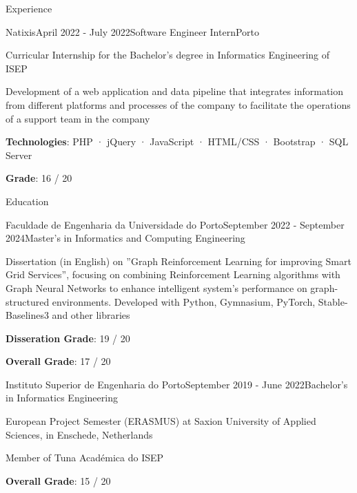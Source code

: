 \documentclass[
	11pt, %
]{cv} %
\begin{document}
\begin{rSection}{Experience}
	\begin{rSubsection}{Natixis}{April 2022 - July 2022}{Software Engineer Intern}{Porto}
		\item Curricular Internship for the Bachelor’s degree in Informatics Engineering of ISEP
		\item Development of a web application and data pipeline that integrates information from different platforms and processes of the company to facilitate the operations of a support team in the company
		\item \textbf{Technologies}: PHP · jQuery · JavaScript · HTML/CSS · Bootstrap · SQL Server
		\item \textbf{Grade}: 16 / 20
	\end{rSubsection}
\end{rSection}


\begin{rSection}{Education}
	
	\begin{rSubsection}{Faculdade de Engenharia da Universidade do Porto}{September 2022 - September 2024}{Master's in Informatics and Computing Engineering}{}
		\item Dissertation (in English) on ”Graph Reinforcement Learning for improving Smart Grid Services”, focusing on combining Reinforcement Learning algorithms with Graph Neural Networks to enhance intelligent system’s performance on graph-structured environments. Developed with Python, Gymnasium, PyTorch, Stable-Baselines3 and other libraries
		\item \textbf{Disseration Grade}: 19 / 20
		\item \textbf{Overall Grade}: 17 / 20
	\end{rSubsection}
	
	\begin{rSubsection}{Instituto Superior de Engenharia do Porto}{September 2019 - June 2022}{Bachelor's in Informatics Engineering}{}
		\item European Project Semester (ERASMUS) at Saxion University of Applied Sciences, in Enschede, Netherlands
		\item Member of Tuna Académica do ISEP 
		\item \textbf{Overall Grade}: 15 / 20
	\end{rSubsection}
	
\end{rSection}
\end{document}
